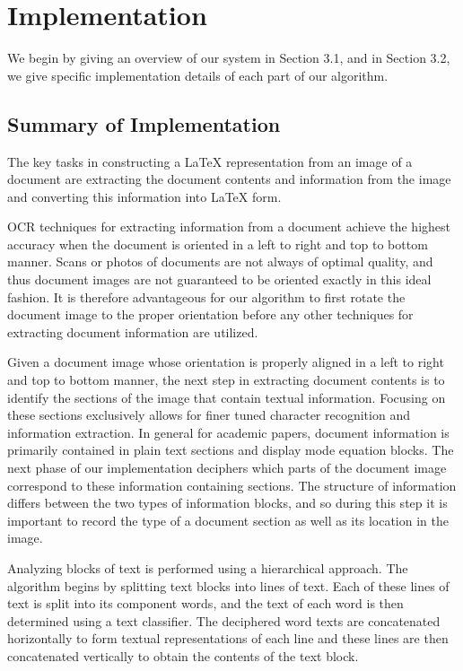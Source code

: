 \documentclass[10pt]{IEEEtran}
\newcommand{\latex}{\LaTeX\xspace}
\begin{document}
\section{Implementation}

We begin by giving an overview of our system in Section 3.1, and in Section 3.2, we give specific implementation details of each part of our algorithm.

\subsection{Summary of Implementation}
The key tasks in constructing a \latex representation from an image of a document are extracting the document contents and information from the image and converting this information into \latex form.

OCR techniques for extracting information from a document achieve the highest accuracy when the document is oriented in a left to right and top to bottom manner. Scans or photos of documents are not always of optimal quality, and thus document images are not guaranteed to be oriented exactly in this ideal fashion. It is therefore advantageous for our algorithm to first rotate the document image to the proper orientation before any other techniques for extracting document information are utilized.

Given a document image whose orientation is properly aligned in a left to right and top to bottom manner, the next step in extracting document contents is to identify the sections of the image that contain textual information. Focusing on these sections exclusively allows for finer tuned character recognition and information extraction. In general for academic papers, document information is primarily contained in plain text sections and display mode equation blocks. The next phase of our implementation deciphers which parts of the document image correspond to these information containing sections. The structure of information differs between the two types of information blocks, and so during this step it is important to record the type of a document section as well as its location in the image.

Analyzing blocks of text is performed using a hierarchical approach. The algorithm begins by splitting text blocks into lines of text. Each of these lines of text is split into its component words, and the text of each word is then determined using a text classifier. The deciphered word texts are  concatenated horizontally to form textual representations of each line and these lines are then concatenated vertically to obtain the contents of the text block.
\end{document}

